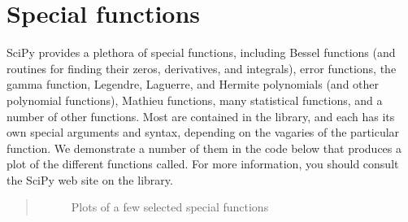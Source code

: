 \documentclass[letterpaper,10pt,english]{sphinxmanual}
\begin{document}
\section{Special functions}
\label{\detokenize{chap9/chap9_scipy:special-functions}}\label{\detokenize{chap9/chap9_scipy:specfunc}}\label{\detokenize{chap9/chap9_scipy:index-0}}
\sphinxAtStartPar
SciPy provides a plethora of special functions, including Bessel functions (and routines for finding their zeros, derivatives, and integrals), error functions, the gamma function, Legendre, Laguerre, and Hermite polynomials (and other polynomial functions), Mathieu functions, many statistical functions, and a number of other functions.  Most are contained in the  library, and each has its own special arguments and syntax, depending on the vagaries of the particular function.  We demonstrate a number of them in the code below that produces a plot of the different functions called.  For more information, you should consult the SciPy web site on the  library.
\begin{quote}

\begin{figure}[htbp]
\centering
\capstart

\noindent{}
\caption{Plots of a few selected special functions}\label{\detokenize{chap9/chap9_scipy:id1}}\label{\detokenize{chap9/chap9_scipy:fig-specfuncplots}}\end{figure}
\end{quote}
\end{document}
